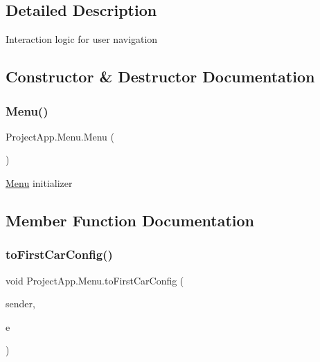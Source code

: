 \subsection{Detailed Description}
Interaction logic for user navigation 



\subsection{Constructor \& Destructor Documentation}
\mbox{\label{class_project_app_1_1_menu_a09bc96d59ae169d1cb7aa52e0ef0d8f7}} 
\subsubsection{\texorpdfstring{Menu()}{Menu()}}
{\footnotesize\ttfamily Project\+App.\+Menu.\+Menu (\begin{DoxyParamCaption}{ }\end{DoxyParamCaption})}



\mbox{\hyperlink{class_project_app_1_1_menu}{Menu}} initializer 



\subsection{Member Function Documentation}
\mbox{\label{class_project_app_1_1_menu_a7b70ab4645dc11404e398248eda91225}} 
\subsubsection{\texorpdfstring{to\+First\+Car\+Config()}{toFirstCarConfig()}}
{\footnotesize\ttfamily void Project\+App.\+Menu.\+to\+First\+Car\+Config (\begin{DoxyParamCaption}\item[{object}]{sender,  }\item[{Routed\+Event\+Args}]{e }\end{DoxyParamCaption})}



